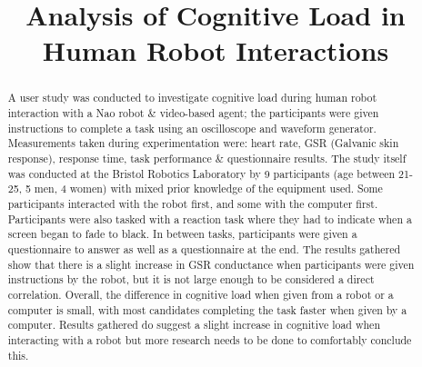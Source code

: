 \documentclass[conference]{IEEEtran}
\begin{document}
\title{Analysis of Cognitive Load in Human Robot Interactions}

\author{
}

\maketitle

\begin{abstract}
A user study was conducted to investigate cognitive load during human robot interaction with a Nao robot \cite{web:NaoRobot} \& video-based agent; the participants were given instructions to complete a task using an oscilloscope and waveform generator. Measurements taken during experimentation were: heart rate, GSR (Galvanic skin response), response time, task performance \& questionnaire results. \newline
The study itself was conducted at the Bristol Robotics Laboratory by 9 participants (age between 21-25, 5 men, 4 women) with mixed prior knowledge of the equipment used. Some participants interacted with the robot first, and some with the computer first. Participants were also tasked with a reaction task where they had to indicate when a screen began to fade to black. In between tasks, participants were given a questionnaire to answer as well as a questionnaire at the end. \newline
The results gathered show that there is a slight increase in GSR conductance when participants were given instructions by the robot, but it is not large enough to be considered a direct correlation. Overall, the difference in cognitive load when given from a robot or a computer is small, with most candidates completing the task faster when given by a computer. \newline
Results gathered do suggest a slight increase in cognitive load when interacting with a robot but more research needs to be done to comfortably conclude this. 
\end{abstract}
\end{document}
